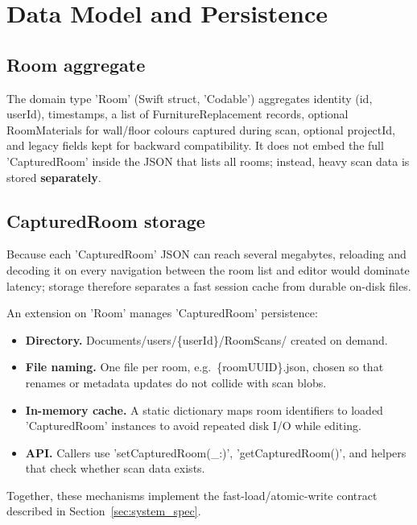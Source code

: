 \section{Data Model and Persistence}
\label{sec:ch5_data_model}

\subsection{Room aggregate}

The domain type 'Room' (Swift struct, 'Codable') aggregates identity (id, userId), timestamps, a list of FurnitureReplacement records, optional RoomMaterials for wall/floor colours captured during scan, optional projectId, and legacy fields kept for backward compatibility. It does not embed the full 'CapturedRoom' inside the JSON that lists all rooms; instead, heavy scan data is stored \textbf{separately}.

\subsection{CapturedRoom storage}

Because each 'CapturedRoom' JSON can reach several megabytes, reloading and decoding it on every navigation between the room list and editor would dominate latency; storage therefore separates a fast session cache from durable on-disk files.

An extension on 'Room' manages 'CapturedRoom' persistence:

\begin{itemize}
    \item \textbf{Directory.} Documents/users/\{userId\}/RoomScans/ created on demand.

    \item \textbf{File naming.} One file per room, e.g.\ \{roomUUID\}.json, chosen so that renames or metadata updates do not collide with scan blobs.

    \item \textbf{In-memory cache.} A static dictionary maps room identifiers to loaded 'CapturedRoom' instances to avoid repeated disk I/O while editing.

    \item \textbf{API.} Callers use 'setCapturedRoom(\_:)', 'getCapturedRoom()', and helpers that check whether scan data exists.
\end{itemize}

Together, these mechanisms implement the fast-load/atomic-write contract described in Section~\ref{sec:system_spec}.

